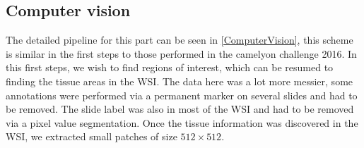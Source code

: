 \documentclass[a4paper,10pt]{article}
\begin{document}
\subsection{Computer vision}

The detailed pipeline for this part can be seen in
\ref{ComputerVision}, this scheme is similar in the first steps to
those performed in the camelyon challenge 2016. In this first steps,
we wish to find regions of interest, which can be resumed to finding
the tissue areas in the WSI. The data here was a lot more messier,
some annotations were performed via a permanent marker on several
slides and had to be removed. The slide label was also in most of the
WSI and had to be removed via a pixel value segmentation. Once the
tissue information was discovered in the WSI, we extracted small
patches of size $512 \times 512$. 
\end{document}
